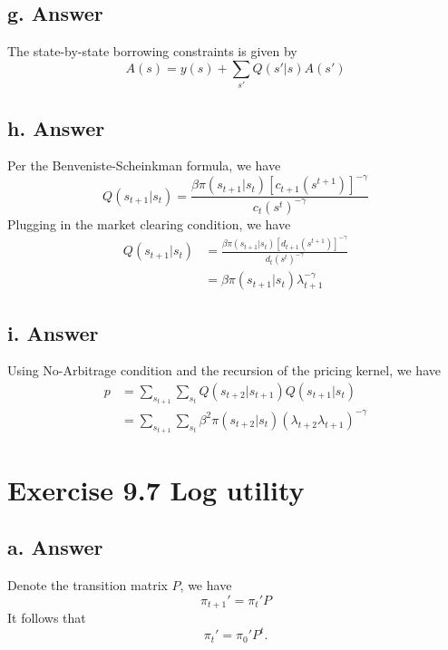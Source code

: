\documentclass[11pt]{article}
\theoremstyle{definition}
\theoremstyle{boldtitle} %
\numberwithin{equation}{section}
\numberwithin{figure}{section}
\numberwithin{table}{section}
\begin{document}
\subsection{g. Answer}
The state-by-state borrowing constraints is given by 
\[
A(s) = y(s) + \sum_{s'} Q(s'|s)  A(s')
\]

\subsection{h. Answer}
Per the Benveniste-Scheinkman formula, we have 
\[
Q(s_{t+1}|s_t) = \frac{\beta \pi(s_{t+1}| s_t) \left[c_{t+1}(s^{t+1})\right]^{-\gamma}}{c_{t}(s^t)^{-\gamma}}
\]
Plugging in the market clearing condition, we have 
\begin{align*}
    Q(s_{t+1}|s_t) & = \frac{\beta \pi(s_{t+1}| s_t) \left[d_{t+1}(s^{t+1})\right]^{-\gamma}}{d_{t}(s^t)^{-\gamma}} \\ 
    & = \beta \pi(s_{t+1}| s_t) \lambda_{t+1}^{-\gamma}
\end{align*}

\subsection{i. Answer}
Using No-Arbitrage condition and the recursion of the pricing kernel, we have 
\begin{align*}
    p & = \sum_{s_{t+1}} \sum_{s_t} Q(s_{t+2}|s_{t+1}) Q(s_{t+1}|s_t) \\ 
        & = \sum_{s_{t+1}} \sum_{s_t} \beta^2 \pi(s_{t+2}| s_t) ( \lambda_{t+2} \lambda_{t+1})^{-\gamma}
\end{align*}



\section{Exercise 9.7 Log utility}
\subsection{a. Answer} 
Denote the transition matrix $P$, we have 
\[
\pi_{t+1}' = \pi_t' P
\]
It follows that 
\[
\pi_t' = \pi_0' P^t.
\]
\end{document}
